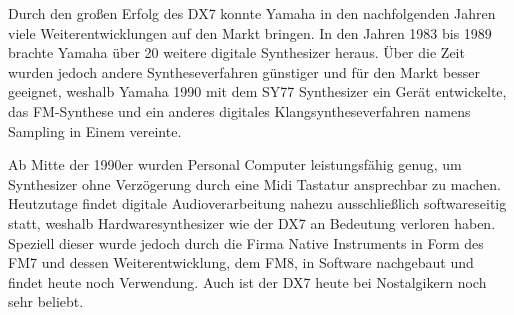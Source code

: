 Durch den großen Erfolg des DX7 konnte Yamaha in den nachfolgenden Jahren viele Weiterentwicklungen auf den Markt bringen. In den Jahren 1983 bis 1989 brachte Yamaha über 20 weitere digitale Synthesizer heraus. Über die Zeit wurden jedoch andere Syntheseverfahren günstiger und für den Markt besser geeignet, weshalb Yamaha 1990 mit dem SY77 Synthesizer ein Gerät entwickelte, das FM-Synthese und ein anderes digitales Klangsyntheseverfahren namens Sampling in Einem vereinte.\cite{fmGS1}

Ab Mitte der 1990er wurden Personal Computer leistungsfähig genug, um Synthesizer ohne Verzögerung durch eine Midi Tastatur ansprechbar zu machen. Heutzutage findet digitale Audioverarbeitung nahezu ausschließlich softwareseitig statt, weshalb Hardwaresynthesizer wie der DX7 an Bedeutung verloren haben. Speziell dieser wurde jedoch durch die Firma Native Instruments in Form des FM7 und dessen Weiterentwicklung, dem FM8, in Software nachgebaut und findet heute noch Verwendung. Auch ist der DX7 heute bei Nostalgikern noch sehr beliebt.\cite{fmGS1}